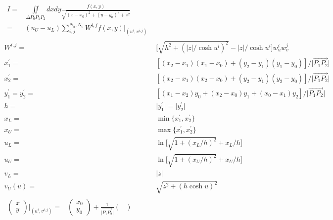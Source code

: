 \documentclass [10pt,letterpaper]{article}
\begin{document}
\begin{subequations} \label{eq:radial-angular-method-summary-of-equations}
	\begin{align}
		\begin{split} 
			I
			=&
			\iint \limits_{\Delta P_0 P_1 P_2}
			dx dy
			\frac{ f(x,y) } { \sqrt{ (x-x_0)^2 + (y-y_0)^2 + z^2 } }
			\\
			=&
			(u_U-u_L)
			\sum \nolimits_{i,j}^{N_u,N_v} 
			W^{i,j}
			f(x,y)
			\big\vert
			_{ (u^i,v^{i,j}) }
		\end{split}
		\\
		W^{i,j}
		=& 
			\big [
				\sqrt{ h^2 + (
					{ \lvert z \rvert } / { \cosh{u^i} } )^2 }
				- { \lvert z \rvert } / { \cosh{u^i} }
			\big ]
			w_u^i w_v^j
		\\
		x_1^{\prime}	
		=&	
		[
			(x_2-x_1)(x_1-x_0)
			+ 
			(y_2-y_1)(y_1-y_0)
		]
		/{\lvert \overrightarrow{P_1 P_2} \rvert}
		\\ 
		x_2^{\prime}	
		=&	
		[
			(x_2-x_1)(x_2-x_0)
			+ 
			(y_2-y_1)(y_2-y_0)
		]
		/{\lvert \overrightarrow{P_1 P_2} \rvert}
		\\
		y_1^{\prime}
		=y_2^{\prime}
		=& 
		[
			(x_1-x_2)y_0
			+
			(x_2-x_0)y_1
			+
			(x_0-x_1)y_2 
		]
		/{\lvert \overrightarrow{P_1 P_2} \rvert}
		\\
		h
		=&
		\lvert y_1^{\prime} \rvert
		=
		\lvert y_2^{\prime} \rvert
		\\
		x_L
		=&
		\min
		\{
			x_1^{\prime},
			x_2^{\prime}
		\}
		\\
		x_U
		=&
		\max
		\{
			x_1^{\prime},
			x_2^{\prime}
		\}
		\\
		u_L	=&
			\ln\big[
				\sqrt{1+({x_L}/{h})^2}
				+ {x_L}/{h}
			\big]
		\\
		u_U	=&
			\ln\big[
				\sqrt{1+({x_U}/{h})^2}
				+ {x_U}/{h}
			\big]
		\\
		v_L	=&	\lvert z \rvert				\\
		v_U(u)	=&	\sqrt{ z^2 + (h \cosh{u})^2 }		\\ 
		\begin{split} 
			\begin{pmatrix} 
				x					\\
				y
			\end{pmatrix}
			\bigg\vert _{ (u^i,v^{i,j}) }
			=& 
			\begin{pmatrix}
				x_0					\\
				y_0
			\end{pmatrix}
			+
			\frac{1}{\lvert \overrightarrow{P_1 P_2} \rvert}
			\begin{pmatrix} 

\end{pmatrix}
\end{split}
\end{align}
\end{subequations}
\end{document}
